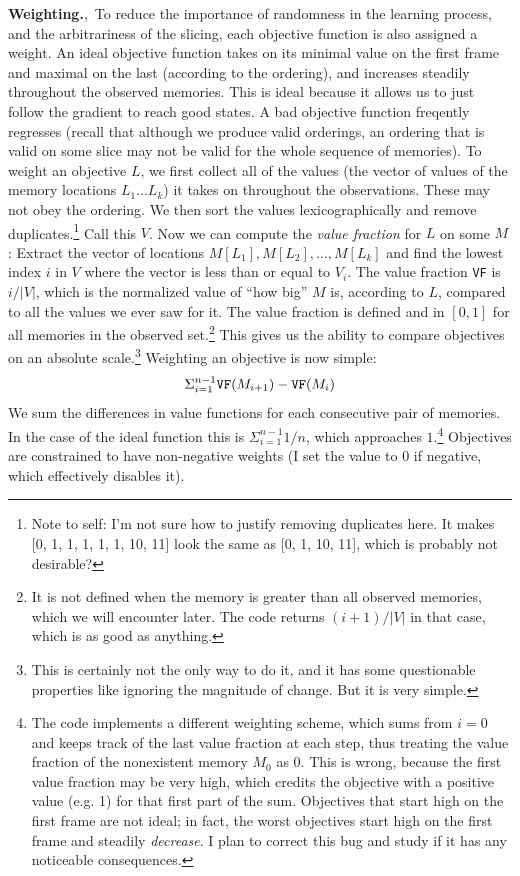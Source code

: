 \documentclass[twocolumn]{article}
\begin{document}
{\bf Weighting.},\, To reduce the importance of randomness in the
learning process, and the arbitrariness of the slicing, each objective
function is also assigned a weight. An ideal objective function takes
on its minimal value on the first frame and maximal on the last
(according to the ordering), and increases steadily throughout the
observed memories. This is ideal because it allows us to just follow
the gradient to reach good states. A bad objective function freqently
regresses (recall that although we produce valid orderings, an
ordering that is valid on some slice may not be valid for the whole
sequence of memories). To weight an objective $L$, we first collect
all of the values (the vector of values of the memory locations $L_1
\ldots L_k$) it takes on throughout the observations. These may not
obey the ordering. We then sort the values lexicographically and
remove duplicates.\footnote{Note to self: I'm not sure how to justify
  removing duplicates here. It makes [0, 1, 1, 1, 1, 1, 10, 11] look
  the same as [0, 1, 10, 11], which is probably not desirable?} Call
this $V$. Now we can compute the {\em value fraction} for $L$ on some
$M$: Extract the vector of locations $M[L_1], M[L_2], \ldots, M[L_k]$
and find the lowest index $i$ in $V$ where the vector is less than or
equal to $V_i$. The value fraction {\tt VF} is $i/|V|$, which is the
normalized value of ``how big'' $M$ is, according to $L$, compared to
all the values we ever saw for it. The value fraction is defined and
in $[0, 1]$ for all memories in the observed set.\footnote{It is not
  defined when the memory is greater than all observed memories, which
  we will encounter later. The code returns $(i+1)/|V|$ in that case,
  which is as good as anything.} This gives us the ability to compare
objectives on an absolute scale.\footnote{This is certainly not the
  only way to do it, and it has some questionable properties like
  ignoring the magnitude of change. But it is very simple.} Weighting
an objective is now simple:
%
$$ \Sigma_{i=1}^{n-1}  {\tt VF}(M_{i+1}) - {\tt VF}(M_{i}) $$
%
We sum the differences in value functions for each consecutive pair of
memories. In the case of the ideal function this is $\Sigma_{i=1}^{n-1}
1/n$, which approaches $1$.\footnote{The code implements a different
  weighting scheme, which sums from $i=0$ and keeps track of the last
  value fraction at each step, thus treating the value fraction of the
  nonexistent memory $M_0$ as 0. This is wrong, because the first
  value fraction may be very high, which credits the objective with a
  positive value (e.g. 1) for that first part of the sum. Objectives
  that start high on the first frame are not ideal; in fact, the worst
  objectives start high on the first frame and steadily {\em
    decrease}. I plan to correct this bug and study if it has any
  noticeable consequences.} Objectives are constrained to have
non-negative weights (I set the value to 0 if negative, which
effectively disables it).
\end{document}
